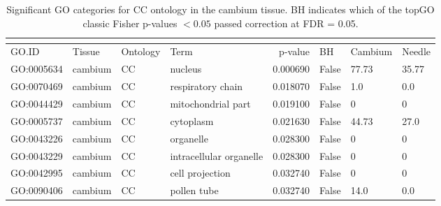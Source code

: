 \begin{longtable}{llllrl}
\caption{Significant GO categories for CC ontology in the cambium tissue. BH indicates which of the topGO classic Fisher p-values $< 0.05$ passed correction at FDR = 0.05.}\\
\label{tab:go-cambium-CC}\\
\toprule
GO.ID & Tissue & Ontology & Term & p-value & BH & Cambium & Needle \\
\midrule
GO:0005634 & cambium & CC &   nucleus  & 0.000690 &   False  & 77.73 & 35.77 \\ 
GO:0070469 & cambium & CC &   respiratory chain  & 0.018070 &   False  & 1.0 & 0.0 \\ 
GO:0044429 & cambium & CC &   mitochondrial part  & 0.019100 &   False  & 0 & 0 \\
GO:0005737 & cambium & CC &   cytoplasm  & 0.021630 &   False  & 44.73 & 27.0 \\ 
GO:0043226 & cambium & CC &   organelle  & 0.028300 &   False  & 0 & 0 \\
GO:0043229 & cambium & CC &   intracellular organelle  & 0.028300 &   False  & 0 & 0 \\
GO:0042995 & cambium & CC &   cell projection  & 0.032740 &   False  & 0 & 0 \\
GO:0090406 & cambium & CC &   pollen tube  & 0.032740 &   False  & 14.0 & 0.0 \\ 
\bottomrule
\end{longtable}

